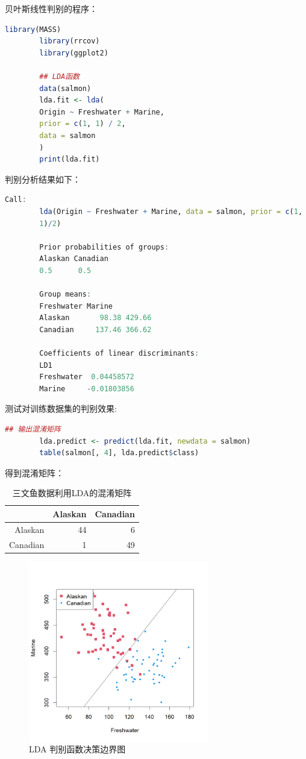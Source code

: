 \documentclass[12pt, a4paper, oneside]{ctexart}
\begin{document}
	贝叶斯线性判别的程序：
	\begin{lstlisting}[language=R]
		library(MASS)
		library(rrcov)
		library(ggplot2)
		
		## LDA函数
		data(salmon)
		lda.fit <- lda(
		Origin ~ Freshwater + Marine,
		prior = c(1, 1) / 2,
		data = salmon
		)
		print(lda.fit)
	\end{lstlisting}
	判别分析结果如下：
	\begin{lstlisting}[language=R]
		Call:
		lda(Origin ~ Freshwater + Marine, data = salmon, prior = c(1,
		1)/2)
		
		Prior probabilities of groups:
		Alaskan Canadian
		0.5      0.5
		
		Group means:
		Freshwater Marine
		Alaskan       98.38 429.66
		Canadian     137.46 366.62
		
		Coefficients of linear discriminants:
		LD1
		Freshwater  0.04458572
		Marine     -0.01803856
	\end{lstlisting}
	测试对训练数据集的判别效果:
	\begin{lstlisting}[language=R]
		## 输出混淆矩阵
		lda.predict <- predict(lda.fit, newdata = salmon)
		table(salmon[, 4], lda.predict$class)
	\end{lstlisting}
	得到混淆矩阵：
	\begin{table}[ht]
		\caption{三文鱼数据利用LDA的混淆矩阵}
		\centering
		\begin{tabular}{rrr}
			\hline
			& Alaskan & Canadian \\
			\hline
			Alaskan &  44 &   6 \\
			Canadian &   1 &  49 \\
			\hline
		\end{tabular}
	\end{table}
	\begin{figure}[htbp]
		\centering
		\includegraphics[width=0.7\textwidth]{../Figure/lda_boundary_plot.png}
		\caption{LDA 判别函数决策边界图}
		\label{fig:lda}
	\end{figure}
	
\end{document}
